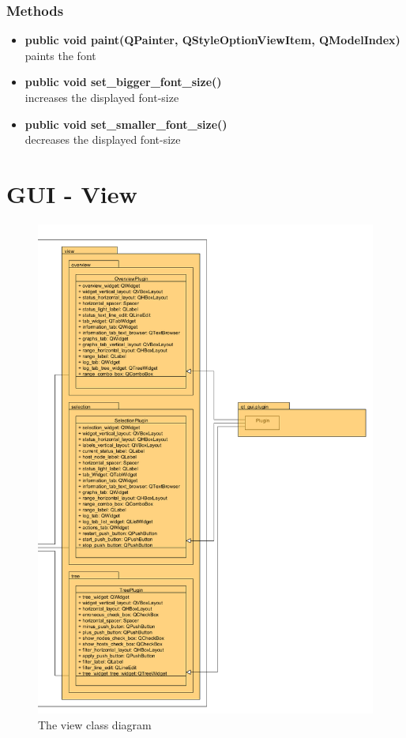 \subsubsection{Methods}
\begin{itemize}
  \item \textbf{public void paint(QPainter, QStyleOptionViewItem,
  QModelIndex)}\\
  paints the font
  \item \textbf{public void set\_bigger\_font\_size()}\\
  increases the displayed font-size
  \item \textbf{public void set\_smaller\_font\_size()}\\
  decreases the displayed font-size
\end{itemize}

\newpage
\section{GUI - View}
\begin{figure}[!ht]
\begin{center}
\includegraphics[width=0.8\linewidth]{./bilder/view.png}
\caption{The view class diagram}
\end{center}
\end{figure}

